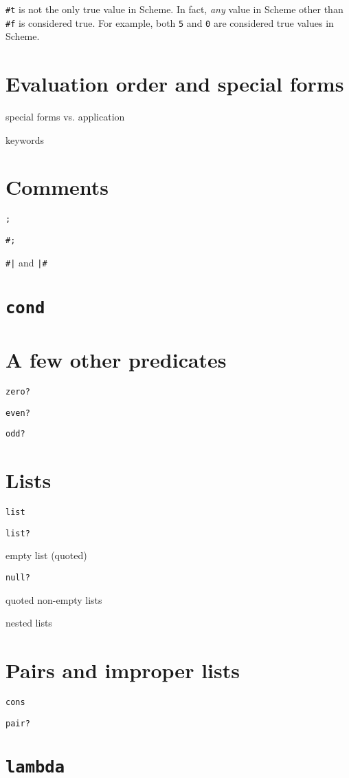 \documentclass{book}
\begin{document}
\verb|#t| is not the only true value in Scheme.
In fact, \emph{any} value in Scheme other than \verb|#f| is considered true.
For example, both \verb|5| and \verb|0| are considered true values in Scheme.

\section{Evaluation order and special forms}

special forms vs. application

keywords

\section{Comments}

\verb|;|

\verb|#;|

\texttt{\#|} and
\texttt{|\#}

\section{\texttt{cond}}

\section{A few other predicates}

\verb|zero?|

\verb|even?|

\verb|odd?|

\section{Lists}

\verb|list|

\verb|list?|

empty list (quoted)

\verb|null?|

quoted non-empty lists

nested lists

\section{Pairs and improper lists}

\verb|cons|

\verb|pair?|

\section{\texttt{lambda}}
\end{document}

